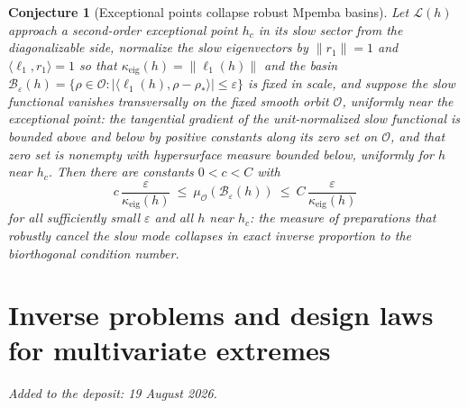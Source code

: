 \documentclass[11pt]{article}
\newtheorem{conjecture}{Conjecture}
\theoremstyle{definition}
\newcommand{\eps}{\varepsilon}
\begin{document}
\begin{conjecture}[Exceptional points collapse robust Mpemba basins]\label{ag9}
Let $\mathcal L(h)$ approach a second-order exceptional point $h_c$ in its slow sector from the diagonalizable side, normalize the slow eigenvectors by $\|r_1\|=1$ and $\langle\ell_1,r_1\rangle=1$ so that $\kappa_{\mathrm{eig}}(h)=\|\ell_1(h)\|$ and the basin $\mathcal B_\eps(h)=\{\rho\in\mathcal O:|\langle\ell_1(h),\rho-\rho_*\rangle|\le\eps\}$ is fixed in scale, and suppose the slow functional vanishes transversally on the fixed smooth orbit $\mathcal O$, uniformly near the exceptional point: the tangential gradient of the unit-normalized slow functional is bounded above and below by positive constants along its zero set on $\mathcal O$, and that zero set is nonempty with hypersurface measure bounded below, uniformly for $h$ near $h_c$.  Then there are constants $0<c<C$ with
\[
c\,\frac{\eps}{\kappa_{\mathrm{eig}}(h)}\ \le\ \mu_\mathcal O(\mathcal B_\eps(h))\ \le\ C\,\frac{\eps}{\kappa_{\mathrm{eig}}(h)}
\]
for all sufficiently small $\eps$ and all $h$ near $h_c$: the measure of preparations that robustly cancel the slow mode collapses in exact inverse proportion to the biorthogonal condition number.
\end{conjecture}


\part{Inverse problems and design laws for multivariate extremes}

\medskip\noindent\emph{Added to the deposit: 19 August 2026.}\par\medskip
\end{document}
